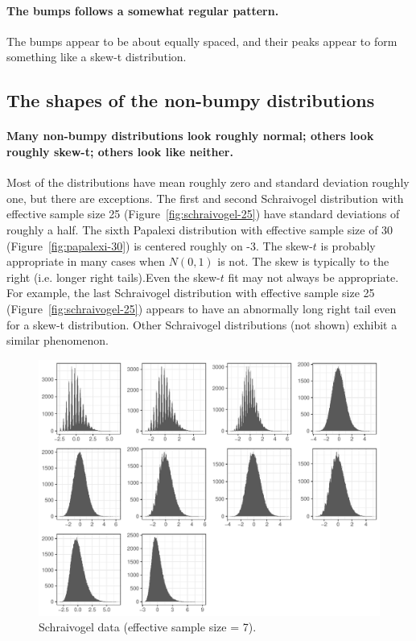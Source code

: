 \documentclass[12pt]{article}
\begin{document}
\paragraph{The bumps follows a somewhat regular pattern.}

The bumps appear to be about equally spaced, and their peaks appear to form something like a skew-t distribution. 

\subsection{The shapes of the non-bumpy distributions}

\paragraph{Many non-bumpy distributions look roughly normal; others look roughly skew-t; others look like neither.} Most of the distributions have mean roughly zero and standard deviation roughly one, but there are exceptions. The first and second Schraivogel distribution with effective sample size 25 (Figure~\ref{fig:schraivogel-25}) have standard deviations of roughly a half. The sixth Papalexi distribution with effective sample size of 30 (Figure~\ref{fig:papalexi-30}) is centered roughly on -3. The skew-$t$ is probably appropriate in many cases when $N(0,1)$ is not. The skew is typically to the right (i.e. longer right tails).Even the skew-$t$ fit may not always be appropriate. For example, the last Schraivogel distribution with effective sample size 25 (Figure~\ref{fig:schraivogel-25}) appears to have an abnormally long right tail even for a skew-t distribution. Other Schraivogel distributions (not shown) exhibit a similar phenomenon.

\begin{figure}[h!]
\includegraphics[width = \textwidth]{figures/schraivogel_enhancer_screen_chr11_gene_eff_ss_7.pdf}
\caption{Schraivogel data (effective sample size = 7).}
\label{fig:schraivogel-7}
\end{figure}
\end{document}
